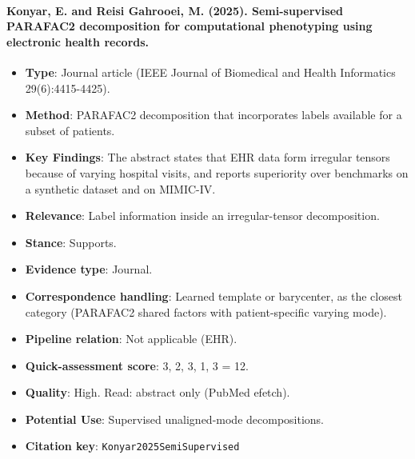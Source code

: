 \documentclass[journal,onecolumn]{IEEEtran}
\begin{document}
\paragraph{Konyar, E. and Reisi Gahrooei, M. (2025). Semi-supervised PARAFAC2 decomposition for computational phenotyping using electronic health records.~\cite{Konyar2025SemiSupervised}}\mbox{}

\begin{itemize}

\item{} \textbf{Type}: Journal article (IEEE Journal of Biomedical and Health Informatics 29(6):4415-4425).

\item{} \textbf{Method}: PARAFAC2 decomposition that incorporates labels available for a subset of patients.

\item{} \textbf{Key Findings}: The abstract states that EHR data form irregular tensors because of varying hospital visits, and reports superiority over benchmarks on a synthetic dataset and on MIMIC-IV.

\item{} \textbf{Relevance}: Label information inside an irregular-tensor decomposition.

\item{} \textbf{Stance}: Supports.

\item{} \textbf{Evidence type}: Journal.

\item{} \textbf{Correspondence handling}: Learned template or barycenter, as the closest category (PARAFAC2 shared factors with patient-specific varying mode).

\item{} \textbf{Pipeline relation}: Not applicable (EHR).

\item{} \textbf{Quick-assessment score}: 3, 2, 3, 1, 3 = 12.

\item{} \textbf{Quality}: High. Read: abstract only (PubMed efetch).

\item{} \textbf{Potential Use}: Supervised unaligned-mode decompositions.

\item{} \textbf{Citation key}: \texttt{Konyar2025SemiSupervised}

\end{itemize}
\end{document}

